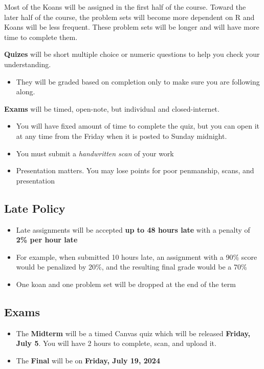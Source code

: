 \documentclass[
  letterpaper,
  DIV=11,
  numbers=noendperiod]{scrartcl}
\providecommand{\tightlist}{%
  \setlength{\itemsep}{0pt}\setlength{\parskip}{0pt}}\usepackage{longtable,booktabs,array}
\begin{document}
Most of the Koans will be assigned in the first half of the course.
Toward the later half of the course, the problem sets will become more
dependent on R and Koans will be less frequent. These problem sets will
be longer and will have more time to complete them.

\textbf{Quizes} will be short multiple choice or numeric questions to
help you check your understanding.

\begin{itemize}
\tightlist
\item
  They will be graded based on completion only to make sure you are
  following along.
\end{itemize}

\textbf{Exams} will be timed, open-note, but individual and
closed-internet.

\begin{itemize}
\tightlist
\item
  You will have fixed amount of time to complete the quiz, but you can
  open it at any time from the Friday when it is posted to Sunday
  midnight.
\item
  You must submit a \emph{handwritten scan} of your work
\item
  Presentation matters. You may lose points for poor penmanship, scans,
  and presentation
\end{itemize}

\subsection{Late Policy}\label{late-policy}

\begin{itemize}
\tightlist
\item
  Late assignments will be accepted \textbf{up to 48 hours late} with a
  penalty of \textbf{2\% per hour late}
\item
  For example, when submitted 10 hours late, an assignment with a 90\%
  score would be penalized by 20\%, and the resulting final grade would
  be a 70\%
\item
  One koan and one problem set will be dropped at the end of the term
\end{itemize}

\subsection{Exams}\label{exams}

\begin{itemize}
\tightlist
\item
  The \textbf{Midterm} will be a timed Canvas quiz which will be
  released \textbf{Friday, July 5}. You will have 2 hours to complete,
  scan, and upload it.
\item
  The \textbf{Final} will be on \textbf{Friday, July 19, 2024}
\end{itemize}
\end{document}
